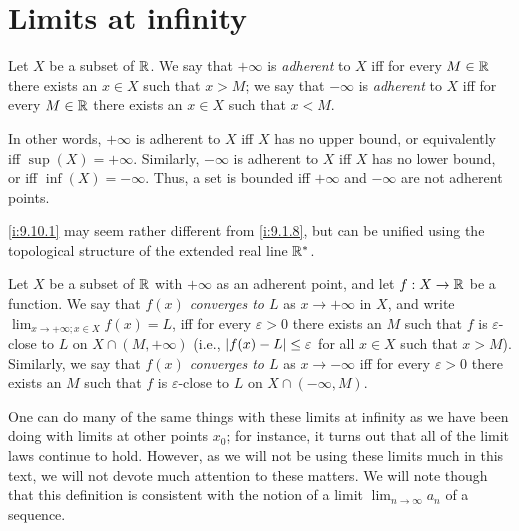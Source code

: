 \section{Limits at infinity}\label{i:sec:9.10}

\begin{defn}\label{i:9.10.1}
  Let \(X\) be a subset of \(\mathbb{R}\).
  We say that \(+\infty\) is \emph{adherent} to \(X\) iff for every \(M \in \mathbb{R}\) there exists an \(x \in X\) such that \(x > M\);
  we say that \(-\infty\) is \emph{adherent} to \(X\) iff for every \(M \in \mathbb{R}\) there exists an \(x \in X\) such that \(x < M\).
\end{defn}

\begin{note}
  In other words, \(+\infty\) is adherent to \(X\) iff \(X\) has no upper bound, or equivalently iff \(\sup(X) = +\infty\).
  Similarly, \(-\infty\) is adherent to \(X\) iff \(X\) has no lower bound, or iff \(\inf(X) = -\infty\).
  Thus, a set is bounded iff \(+\infty\) and \(-\infty\) are not adherent points.
\end{note}

\begin{rmk}\label{i:9.10.2}
  \cref{i:9.10.1} may seem rather different from \cref{i:9.1.8}, but can be unified using the topological structure of the extended real line \(\mathbb{R}^*\).
\end{rmk}

\begin{defn}\label{i:9.10.3}
  Let \(X\) be a subset of \(\mathbb{R}\) with \(+\infty\) as an adherent point, and let \(f : X \to \mathbb{R}\) be a function.
  We say that \emph{\(f(x)\) converges to \(L\)} as \(x \to +\infty\) in \(X\), and write \(\lim_{x \to +\infty ; x \in X} f(x) = L\), iff for every \(\varepsilon > 0\) there exists an \(M\) such that \(f\) is \(\varepsilon\)-close to \(L\) on \(X \cap (M, +\infty)\)
  (i.e., \(\left\lvert f(x) - L\right\rvert \leq \varepsilon\) for all \(x \in X\) such that \(x > M\)).
  Similarly, we say that \emph{\(f(x)\) converges to \(L\)} as \(x \to -\infty\) iff for every \(\varepsilon > 0\) there exists an \(M\) such that \(f\) is \(\varepsilon\)-close to \(L\) on \(X \cap (-\infty, M)\).
\end{defn}

\begin{note}
  One can do many of the same things with these limits at infinity as we have been doing with limits at other points \(x_0\);
  for instance, it turns out that all of the limit laws continue to hold.
  However, as we will not be using these limits much in this text, we will not devote much attention to these matters.
  We will note though that this definition is consistent with the notion of a limit \(\lim_{n \to \infty} a_n\) of a sequence.
\end{note}

